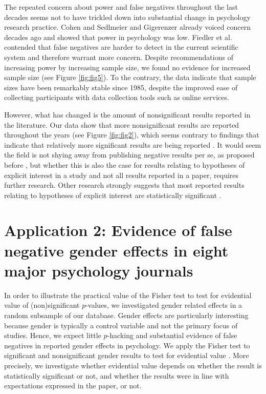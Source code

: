 \documentclass{article}
\begin{document}
The repeated concern about power and false negatives throughout the last decades seems not to have trickled down into substantial change in psychology research practice. Cohen \cite{Cohen1962-jc} and Sedlmeier and Gigerenzer \cite{Sedlmeier1989-yc} already voiced concern decades ago and showed that power in psychology was low. Fiedler et al. \cite{Fiedler2012-gx} contended that false negatives are harder to detect in the current scientific system and therefore warrant more concern. Despite recommendations of increasing power by increasing sample size, we found no evidence for increased sample size (see Figure \ref{fig:fig5}). To the contrary, the data indicate that sample sizes have been remarkably stable since 1985, despite the improved ease of collecting participants with data collection tools such as online services.

However, what has changed is the amount of nonsignificant results reported in the literature. Our data show that more nonsignificant results are reported throughout the years (see Figure \ref{fig:fig2}), which seems contrary to findings that indicate that relatively more significant results are being reported \cite{Fanelli2011-xa, Sterling1995-fe, Sterling1959-pf,De_Winter2015-ru}. It would seem the field is not shying away from publishing negative results per se, as proposed before \cite{Fanelli2011-xa,Greenwald1975-ck,Nosek2012-aw,Rosenthal1979-lx,Schimmack2012-du}, but whether this is also the case for results relating to hypotheses of explicit interest in a study and not all results reported in a paper, requires further research. Other research strongly suggests that most reported results relating to hypotheses of explicit interest are statistically significant \cite{Open_Science_Collaboration2015-zs}.

\section*{Application 2: Evidence of false negative gender effects in eight major psychology journals}

In order to illustrate the practical value of the Fisher test to test for evidential value of (non)significant $p$-values, we investigated gender related effects in a random subsample of our database. Gender effects are particularly interesting because gender is typically a control variable and not the primary focus of studies. Hence, we expect little $p$-hacking and substantial evidence of false negatives in reported gender effects in psychology. We apply the Fisher test to significant and nonsignificant gender results to test for evidential value \cite{Van_Assen2015-gg,Simonsohn2014-dm}. More precisely, we investigate whether evidential value depends on whether the result is statistically significant or not, and whether the results were in line with expectations expressed in the paper, or not.
\end{document}
